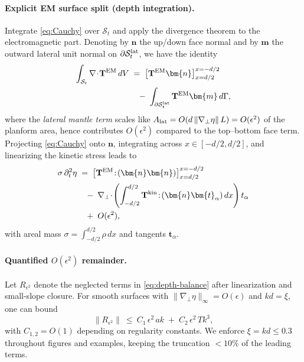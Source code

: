 \documentclass[aps,pre,twocolumn,showpacs,superscriptaddress]{revtex4-2}
\theoremstyle{definition}
\begin{document}
\paragraph{Explicit EM surface split (depth integration).}
Integrate \eqref{eq:Cauchy} over $\mathcal{S}_t$ and apply the divergence theorem to the electromagnetic part. Denoting by $\bm{n}$ the up/down face normal and by $\bm{m}$ the outward lateral unit normal on $\partial\mathcal{S}_t^{\rm lat}$, we have the identity
\begin{align}\label{eq:EM-surface-split}
\int_{\mathcal{S}_t} \nabla\!\cdot\!\mathbf{T}^{\rm EM}\,dV
&\;=\; \big[\mathbf{T}^{\rm EM}\bm{n}\big]_{x=d/2}^{x=-d/2}\nonumber\\
&\quad-\;\int_{\partial\mathcal{S}_t^{\rm lat}}\mathbf{T}^{\rm EM}\bm{m}\,d\Gamma,
\end{align}
where the \emph{lateral mantle term} scales like $A_{\rm lat}=O(d\,\|\nabla_\perp\eta\|\,L)=O(\epsilon^2)$ of the planform area, hence contributes $O(\epsilon^2)$ compared to the top–bottom face term. Projecting \eqref{eq:Cauchy} onto $\bm{n}$, integrating across $x\in[-d/2,d/2]$, and linearizing the kinetic stress leads to
\begin{align}\label{eq:depth-balance}
\sigma\,\partial_t^2\eta &\;=\; \big[\mathbf{T}^{\rm EM}\!:\!(\bm{n}\bm{n})\big]_{x=d/2}^{x=-d/2}\nonumber\\
&\quad-\;\nabla_\perp\!\cdot\!\left(\int_{-d/2}^{d/2}\mathbf{T}^{\rm kin}\!:\!(\bm{n}\bm{t}_\alpha)\,dx\right)t_\alpha \nonumber\\
&\quad+\; O(\epsilon^2),
\end{align}
with areal mass $\sigma=\int_{-d/2}^{d/2}\rho\,dx$ and tangents $\bm{t}_\alpha$.

\paragraph*{Quantified $O(\epsilon^2)$ remainder.}
Let $R_{\epsilon^2}$ denote the neglected terms in \eqref{eq:depth-balance} after linearization and small-slope closure. For smooth surfaces with $\|\nabla_\perp \eta\|_\infty=O(\epsilon)$ and $kd=\xi$, one can bound
\begin{equation}\label{eq:rem-eps2}
\|R_{\epsilon^2}\|\ \le\ C_1\,\epsilon^2\,a k\;+\;C_2\,\epsilon^2\,T k^3,
\end{equation}
with $C_{1,2}=O(1)$ depending on regularity constants. We enforce $\xi=kd\le 0.3$ throughout figures and examples, keeping the truncation $<10\%$ of the leading terms.
\end{document}
